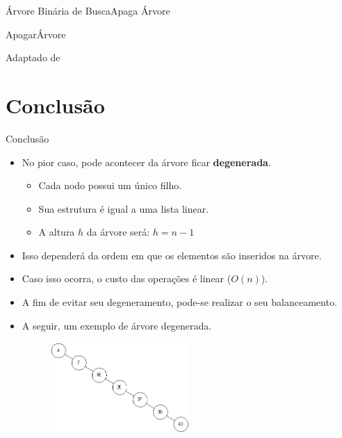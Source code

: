 \documentclass[aspectratio=169]{beamer}
\begin{document}

\begin{frame}{Árvore Binária de Busca}{Apaga Árvore}
\begin{algorithm}[H]
\caption{ApagarÁrvore} 
\label{ApagarArvore}
\end{algorithm}
\tiny{Adaptado de \cite{Backes2016}}  
\end{frame}



\section{Conclusão}

\begin{frame}{Conclusão}
\begin{itemize}
  \item No pior caso, pode acontecer da árvore ficar {\bf degenerada}.
  \begin{itemize}
  \item Cada nodo possui um único filho.
  \item Sua estrutura é igual a uma lista linear.
  \item A altura $h$ da árvore será: $h = n -1$
\end{itemize}
  \item Isso dependerá da ordem em que os elementos são inseridos na árvore.
  \item Caso isso ocorra, o custo das operações é linear ($O(n)$).
  \item A fim de evitar seu degeneramento, pode-se realizar o seu balanceamento. 
  \item A seguir, um exemplo de árvore degenerada.
\begin{figure}[!h]
  \centering
  \includegraphics[width=150pt]{imagens/arvore_degenerada.png}
  \label{fig_arvore_degenerada}
\end{figure}
 \end{itemize}
\end{frame}
\end{document}
